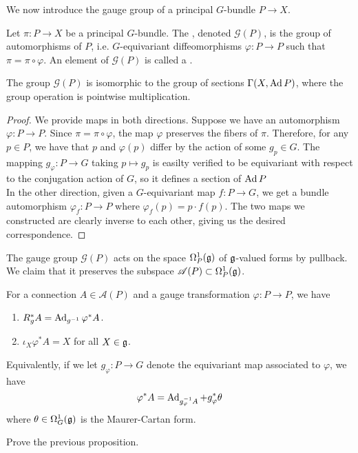 We now introduce the gauge group of a principal $G$-bundle $P \to X$.
%
\begin{defn}
Let $\pi : P \to X$ be a principal $G$-bundle. The , denoted
$\mathscr{G}(P)$, is the group of automorphisms of $P$, i.e. $G$-equivariant
diffeomorphisms $\varphi : P \to P$ such that $\pi = \pi \circ \varphi$.
An element of $\mathscr{G}(P)$ is called a .
\end{defn}
%
\begin{prop}
The group $\mathscr{G}(P)$ is isomorphic to the group of sections
$\Gamma(X,\operatorname{Ad} P)$, where the group operation is pointwise multiplication.
\end{prop}
%
\begin{proof}
We provide maps in both directions. Suppose we have an automorphism
$\varphi : P \to P$. Since $\pi = \pi \circ \varphi$, the map $\varphi$ preserves
the fibers of $\pi$. Therefore, for any $p \in P$, we have that
$p$ and $\varphi(p)$ differ by the action of some $g_p \in G$. The mapping
$g_\varphi : P \to G$ taking $p \mapsto g_p$ is easilty verified to be
equivariant with respect to the conjugation action of $G$, so it defines
a section of $\operatorname{Ad} P$ \\

In the other direction, given a $G$-equivariant map
$f : P \to G$, we get a bundle automorphism $\varphi_f : P \to P$
where  $\varphi_f(p) = p \cdot f(p)$. The two maps we constructed are clearly inverse
to each other, giving us the desired correspondence.
\end{proof}
%
The gauge group $\mathscr{G}(P)$ acts on the space $\Omega^1_P(\mathfrak{g})$ of
$\mathfrak{g}$-valued forms by pullback. We claim that it preserves the
subspace $\mathscr{A}(P) \subset \Omega^1_P(\mathfrak{g})$.
%
\begin{prop}
For a connection $A \in \mathscr{A}(P)$ and a gauge transformation
$\varphi : P \to P$, we have
\begin{enumerate}
  \item $R_g^*A = \operatorname{Ad}_{g^{-1}}\varphi^*A$.
  \item $\iota_X\varphi^*A = X$ for all $X \in \mathfrak{g}$.
\end{enumerate}
Equivalently, if we let $g_\varphi : P \to G$ denote the equivariant map
associated to $\varphi$, we have
\[
\varphi^*A = \operatorname{Ad}_{g^{-1}_\varphi A} + g_\varphi^*\theta
\]
where $\theta \in \Omega^1_G(\mathfrak{g})$ is the Maurer-Cartan form.
\end{prop}
%
\begin{exer}
Prove the previous proposition.
\end{exer}
